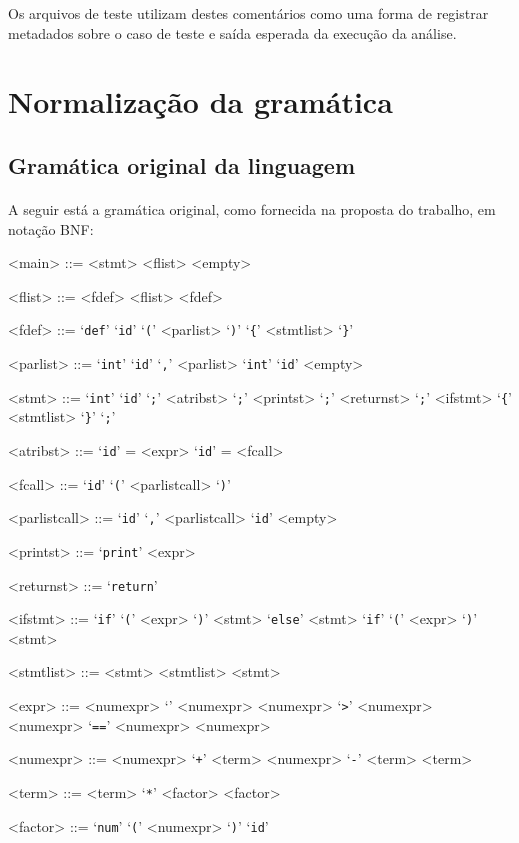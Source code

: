 \documentclass[12pt]{article}
\begin{document}
Os arquivos de teste utilizam destes comentários como uma forma de registrar metadados sobre o caso de teste e saída
esperada da execução da análise.

\newpage
\section{Normalização da gramática}
\label{sec:normalizacao-gramatica}
\subsection{Gramática original da linguagem}

\paragraph{}
A seguir está a gramática original, como fornecida na proposta do trabalho, em notação BNF:

\begin{multicols}{2}
\raggedcolumns
\setlength{\columnseprule}{0.2pt}
\begin{grammar}
<main> ::= <stmt>
  \alt <flist>
  \alt <empty>

<flist> ::= <fdef> <flist>
  \alt <fdef>

<fdef> ::= ‘\texttt{def}’ ‘\texttt{id}’ ‘\texttt{(}’ <parlist> ‘\texttt{)}’ ‘\texttt{\{}’ <stmtlist> ‘\texttt{\}}’

<parlist> ::= ‘\texttt{int}’ ‘\texttt{id}’ ‘\texttt{,}’ <parlist>
  \alt ‘\texttt{int}’ ‘\texttt{id}’
  \alt <empty>

<stmt> ::= ‘\texttt{int}’ ‘\texttt{id}’ ‘\texttt{;}’
  \alt <atribst> ‘\texttt{;}’
  \alt <printst> ‘\texttt{;}’
  \alt <returnst> ‘\texttt{;}’
  \alt <ifstmt>
  \alt ‘\texttt{\{}’ <stmtlist> ‘\texttt{\}}’
  \alt ‘\texttt{;}’

<atribst> ::= ‘\texttt{id}’ = <expr>
  \alt ‘\texttt{id}’ = <fcall>

<fcall> ::= ‘\texttt{id}’ ‘\texttt{(}’ <parlistcall> ‘\texttt{)}’

<parlistcall> ::= ‘\texttt{id}’ ‘\texttt{,}’ <parlistcall>
  \alt ‘\texttt{id}’
  \alt <empty>

<printst> ::= ‘\texttt{print}’ <expr>

<returnst> ::= ‘\texttt{return}’

<ifstmt> ::= ‘\texttt{if}’ ‘\texttt{(}’ <expr> ‘\texttt{)}’ <stmt> ‘\texttt{else}’ <stmt>
  \alt ‘\texttt{if}’ ‘\texttt{(}’ <expr> ‘\texttt{)}’ <stmt>

<stmtlist> ::= <stmt> <stmtlist>
  \alt <stmt>

<expr> ::= <numexpr> ‘\texttt{}’ <numexpr>
  \alt <numexpr> ‘\texttt{>}’ <numexpr>
  \alt <numexpr> ‘\texttt{==}’ <numexpr>
  \alt <numexpr>

<numexpr> ::= <numexpr> ‘\texttt{+}’ <term>
  \alt <numexpr> ‘\texttt{-}’ <term>
  \alt <term>

<term> ::= <term> ‘\texttt{*}’ <factor>
  \alt <factor>

<factor> ::= ‘\texttt{num}’
  \alt ‘\texttt{(}’ <numexpr> ‘\texttt{)}’
  \alt ‘\texttt{id}’
\end{grammar}
\end{multicols}
\end{document}
